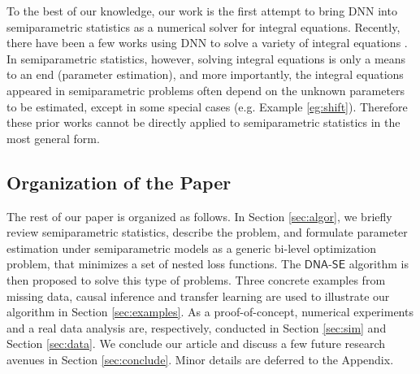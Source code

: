 \documentclass{article}
\def\dnase{{\mathsf{DNA\mbox{-}SE}}}
\def\relu{\mathsf{relu}}
\def\tanh{\mathsf{tanh}}
\def\sigmoid{\mathsf{sigmoid}}
\theoremstyle{plain}
\theoremstyle{definition}
\theoremstyle{remark}
\begin{document}
To the best of our knowledge, our work is the first attempt to bring DNN into semiparametric statistics as a numerical solver for integral equations. Recently, there have been a few works using DNN to solve a variety of integral equations \citep{guan2022solving, zappala2023neural}. In semiparametric statistics, however, solving integral equations is only a means to an end (parameter estimation), and more importantly, the integral equations appeared in semiparametric problems often depend on the unknown parameters to be estimated, except in some special cases (e.g. Example \ref{eg:shift}). Therefore these prior works cannot be directly applied to semiparametric statistics in the most general form.


\subsection*{Organization of the Paper}
The rest of our paper is organized as follows. In Section \ref{sec:algor}, we briefly review semiparametric statistics, describe the problem, and formulate parameter estimation under semiparametric models as a generic bi-level optimization problem, that minimizes a set of nested loss functions. The $\dnase$ algorithm is then proposed to solve this type of problems. Three concrete examples from missing data, causal inference and transfer learning are used to illustrate our algorithm in Section \ref{sec:examples}. As a proof-of-concept, numerical experiments and a real data analysis are, respectively, conducted in Section \ref{sec:sim} and Section \ref{sec:data}. We conclude our article and discuss a few future research avenues in Section \ref{sec:conclude}. Minor details are deferred to the Appendix.
\end{document}
